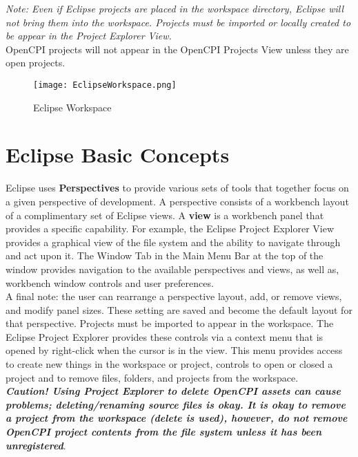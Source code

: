 \begin{appendices}
\emph{Note: Even if Eclipse projects are placed in the workspace directory, Eclipse will not bring them into the workspace. Projects must be imported or locally created to be appear in the Project Explorer View.}\\

OpenCPI projects will not appear in the OpenCPI Projects View unless they are open projects.\\

\begin{figure}[h!]
	\centering
	\caption{Eclipse Workspace}{}
	\texttt{[image: EclipseWorkspace.png]}
 \end{figure}
\newpage
\section{Eclipse Basic Concepts}
Eclipse uses \textbf{Perspectives} to provide various sets of tools that together focus on a given perspective of development. A perspective consists of a workbench layout of a complimentary set of Eclipse views. A \textbf{view} is a workbench panel that provides a specific capability. For example, the Eclipse Project Explorer View provides a graphical view of the file system and the ability to navigate through and act upon it. The Window Tab in the Main Menu Bar at the top of the window provides navigation to the available perspectives and views, as well as, workbench window controls and user preferences. \\

A final note: the user can rearrange a perspective layout, add, or remove views, and modify panel sizes. These setting are saved and become the default layout for that perspective. Projects must be imported to appear in the workspace. The Eclipse Project Explorer provides these controls via a context menu that is opened by right-click when the cursor is in the view. This menu provides access to create new things in the workspace or project, controls to open or closed a project and to remove files, folders, and projects from the workspace.\\

\textbf{\emph{Caution! Using Project Explorer to delete OpenCPI assets can cause problems; deleting/renaming source files is okay. It is okay to remove a project from the workspace (delete is used), however, do not remove OpenCPI project contents from the file system unless it has been unregistered}}. \\


\end{appendices}
